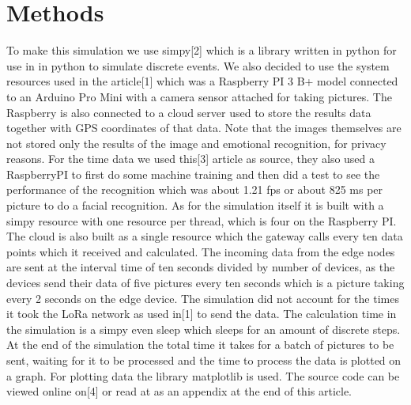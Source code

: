 \documentclass[a4paper,11pt,notitlepage,twocolumn]{article}
\begin{document}
  \section{Methods}
    To make this simulation we use simpy[2] which is a library written in python for use in
    in python to simulate discrete events. We also decided to use the system resources used
    in the article[1] which was a Raspberry PI 3 B+ model connected to an Arduino Pro Mini
    with a camera sensor attached for taking pictures. The Raspberry is also connected to a
    cloud server used to store the results data together with GPS coordinates of that data.
    Note that the images themselves are not stored only the results of the image and
    emotional recognition, for privacy reasons. For the time data we used this[3] article as
    source, they also used a RaspberryPI to first do some machine training and then did a test
    to see the performance of the recognition which was about 1.21 fps or about 825 ms per
    picture to do a facial recognition. As for the simulation itself it is built with a 
    simpy resource with one resource per thread, which is four on the Raspberry PI. The
    cloud is also built as a single resource which the gateway calls every ten data points
    which it received and calculated. The incoming data from the edge nodes are sent at the
    interval time of ten seconds divided by number of devices, as the devices send their data
    of five pictures every ten seconds which is a picture taking every 2 seconds on the edge
    device. The simulation did not account for the times it took the LoRa network as used in[1]
    to send the data. The calculation time in the simulation is a simpy even sleep which sleeps
    for an amount of discrete steps. At the end of the simulation the total time it takes for
    a batch of pictures to be sent, waiting for it to be processed and the time to process
    the data is plotted on a graph. For plotting data the library matplotlib is used. 
    The source code can be viewed online on[4] or read at as an appendix at the end of this article.
  
\end{document}

